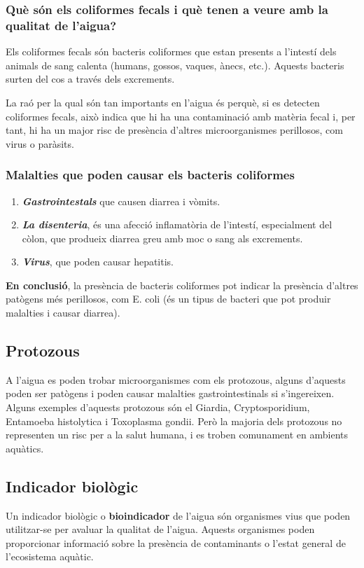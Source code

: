 \subsubsection{Què són els coliformes fecals i què tenen a veure amb la qualitat de l’aigua?}
Els coliformes fecals són bacteris coliformes que estan presents a l’intestí dels animals de sang calenta (humans, gossos, vaques, ànecs, etc.). Aquests bacteris surten del cos a través dels excrements.

La raó per la qual són tan importants en l’aigua és perquè, si es detecten coliformes fecals, això indica que hi ha una contaminació amb matèria fecal i, per tant, hi ha un major risc de presència d’altres microorganismes perillosos, com virus o paràsits.
\subsubsection{Malalties que poden causar els bacteris coliformes}
\begin{enumerate}
 \item \textit{\textbf{Gastrointestals}} que causen diarrea i vòmits.
 \item \textit{\textbf{La disenteria}}, és una afecció inflamatòria de l’intestí, especialment del còlon, que produeix diarrea greu amb moc o sang als excrements.
 \item \textit{\textbf{Virus}}, que poden causar hepatitis.
\end{enumerate}
\textbf{En conclusió}, la presència de bacteris coliformes pot indicar la presència d'altres patògens més perillosos, com E. coli (és un tipus de bacteri que pot produir malalties i causar diarrea).
\subsection{Protozous} \label{subsec:protozous}
A l’aigua es poden trobar microorganismes com els protozous, alguns d’aquests poden ser patògens i poden causar malalties gastrointestinals si s’ingereixen. Alguns exemples d’aquests protozous són el Giardia, Cryptosporidium, Entamoeba histolytica i Toxoplasma gondii. Però la majoria dels protozous no representen un risc per a la salut humana, i es troben comunament en ambients aquàtics.
\subsection{Indicador biològic} \label{subsec:indicadorbiologic}
Un indicador biològic o \textbf{bioindicador} de l’aigua són organismes vius que poden utilitzar-se per avaluar la qualitat de l’aigua. Aquests organismes poden proporcionar informació sobre la presència de contaminants o l’estat general de l’ecosistema aquàtic.\\

